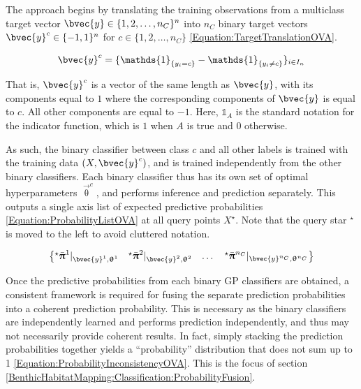 				The approach begins by translating the training observations from a multiclass target vector $\bvec{y} \in \{1, 2, \dots, n_{C}\}^{n}$ into $n_{C}$ binary target vectors $\bvec{y}^{c} \in \{-1, 1\}^{n}$ for $c \in \{1, 2, \dots, n_{C}\}$ \eqref{Equation:TargetTranslationOVA}.
				
				\begin{equation}
					\bvec{y}^{c} = \{\mathds{1}_{\{y_{i} = c\}} - \mathds{1}_{\{y_{i} \neq c\}}\}_{i \in I_{n}}
				\label{Equation:TargetTranslationOVA}
				\end{equation}				
				
				That is, $\bvec{y}^{c}$ is a vector of the same length as $\bvec{y}$, with its components equal to $1$ where the corresponding components of $\bvec{y}$ is equal to $c$. All other components are equal to $-1$. Here, $\mathds{1}_{A}$ is the standard notation for the indicator function, which is $1$ when $A$ is true and $0$ otherwise.
				
				As such, the binary classifier between class $c$ and all other labels is trained with the training data $(X, \bvec{y}^{c})$, and is trained independently from the other binary classifiers. Each binary classifier thus has its own set of optimal hyperparameters $\vec{\uptheta}^{c}$, and performs inference and prediction separately. This outputs a single axis list of expected predictive probabilities \eqref{Equation:ProbabilityListOVA} at all query points $X^{\star}$. Note that the query star $^{\star}$ is moved to the left to avoid cluttered notation.
				
				\begin{equation}
					\begin{Bmatrix*}
						{^{\star}}\bar{\vec{\uppi}}^{1} |_{\bvec{y}^{1}, \vec{\uptheta}^{1}} & {^{\star}}\bar{\vec{\uppi}}^{2} |_{\bvec{y}^{2}, \vec{\uptheta}^{2}} & \dots & {^{\star}}\bar{\vec{\uppi}}^{n_{C}} |_{\bvec{y}^{n_{C}}, \vec{\uptheta}^{n_{C}}}
					\end{Bmatrix*} 
				\label{Equation:ProbabilityListOVA}
				\end{equation}
				
				Once the predictive probabilities from each binary GP classifiers are obtained, a consistent framework is required for fusing the separate prediction probabilities into a coherent prediction probability. This is necessary as the binary classifiers are independently learned and performs prediction independently, and thus may not necessarily provide coherent results. In fact, simply stacking the prediction probabilities together yields a ``probability'' distribution that does not sum up to 1 \eqref{Equation:ProbabilityInconsistencyOVA}. This is the focus of section \ref{BenthicHabitatMapping:Classification:ProbabilityFusion}.


